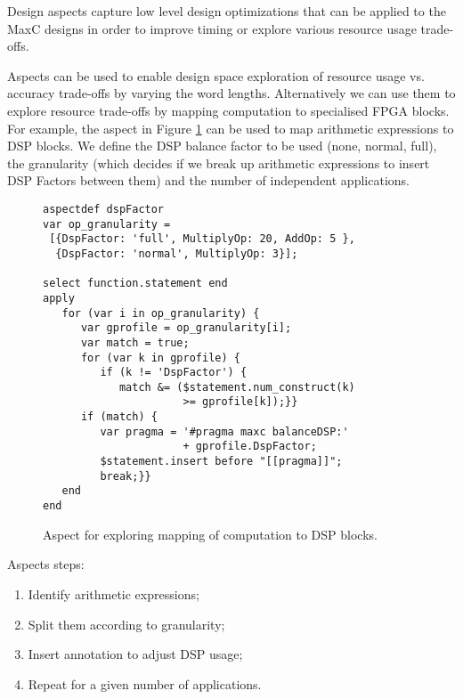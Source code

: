 Design aspects capture low level design optimizations that can be
applied to the MaxC designs in order to improve timing or explore
various resource usage trade-offs.

Aspects can be used to enable design space exploration of resource
usage vs. accuracy trade-offs by varying the word
lengths. Alternatively we can use them to explore resource trade-offs
by mapping computation to specialised FPGA blocks. For example, the
aspect in Figure \ref{fig:aspect-DSP} can be used to map arithmetic
expressions to DSP blocks. We define the DSP balance factor to be used
(none, normal, full), the granularity (which decides if we break up
arithmetic expressions to insert DSP Factors between them) and the
number of independent applications.

\lstset{style=lara}
\begin{figure}[!h]
  \centering
  \begin{lstlisting}
aspectdef dspFactor
var op_granularity =
 [{DspFactor: 'full', MultiplyOp: 20, AddOp: 5 },
  {DspFactor: 'normal', MultiplyOp: 3}];

select function.statement end
apply
   for (var i in op_granularity) {
      var gprofile = op_granularity[i];
      var match = true;
      for (var k in gprofile) {
         if (k != 'DspFactor') {
            match &= ($statement.num_construct(k)
                      >= gprofile[k]);}}
      if (match) {
         var pragma = '#pragma maxc balanceDSP:'
                      + gprofile.DspFactor;
         $statement.insert before "[[pragma]]";
         break;}}
   end
end
  \end{lstlisting}
  \caption{Aspect for exploring mapping of computation to DSP blocks.}
  \label{fig:aspect-DSP}
\end{figure}

Aspects steps:

\begin{enumerate}
\item Identify arithmetic expressions;
\item Split them according to granularity;
\item Insert annotation to adjust DSP usage;
\item Repeat for a given number of applications.
\end{enumerate}

\newsavebox{\secondlisting}
\begin{lrbox}{\secondlisting}%
  
\end{lrbox}

